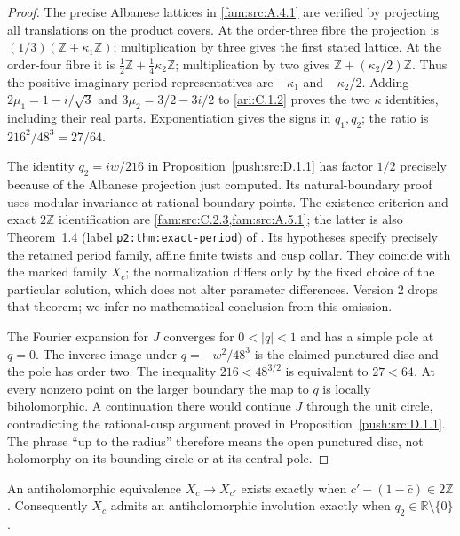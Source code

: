 \begin{proof}
The precise Albanese lattices in \cref{fam:src:A.4.1} are verified by projecting all
translations on the product covers. At the order-three fibre the
projection is $(1/3)(\mathbb Z+\kappa_1\mathbb Z)$; multiplication by
three gives the first stated lattice. At the order-four fibre it is
$\tfrac12\mathbb Z+\tfrac14\kappa_2\mathbb Z$; multiplication by two
gives $\mathbb Z+(\kappa_2/2)\mathbb Z$. Thus the positive-imaginary
period representatives are $-\kappa_1$ and $-\kappa_2/2$.
Adding $2\mu_1=1-i/\sqrt3$ and
$3\mu_2=3/2-3i/2$ to \ref{ari:C.1.2} proves the two $\kappa$ identities,
including their real parts. Exponentiation gives the signs in $q_1,q_2$;
the ratio is $216^2/48^3=27/64$.

The identity $q_2=iw/216$ in Proposition~\ref{push:src:D.1.1} has
factor $1/2$ precisely because of the Albanese projection just computed.
Its natural-boundary proof uses modular invariance at rational boundary
points. The existence criterion and exact $2\mathbb Z$
identification are \cref{fam:src:C.2.3,fam:src:A.5.1}; the latter is also Theorem~1.4
(label \texttt{p2:thm:exact-period}) of
\cite{DuGuoKusakabeXie2026v1}. Its hypotheses specify precisely the
retained period family, affine finite twists and cusp collar. They
coincide with the marked family $X_c$; the normalization differs
only by the fixed choice of the particular solution, which does not
alter parameter differences. Version 2 drops that theorem; we infer
no mathematical conclusion from this omission.

The Fourier expansion for $J$ converges for $0<|q|<1$ and has a simple
pole at $q=0$. The inverse image under $q=-w^2/48^3$ is the claimed
punctured disc and the pole has order two. The inequality
$216<48^{3/2}$ is equivalent to $27<64$. At every nonzero point on the
larger boundary the map to $q$ is locally biholomorphic. A continuation
there would continue $J$ through the unit circle, contradicting the
rational-cusp argument proved in Proposition~\ref{push:src:D.1.1}. The phrase ``up to the
radius'' therefore means the open punctured disc, not holomorphy on
its bounding circle or at its central pole.
\end{proof}

\begin{proposition}\label{ari:C.2.2}
An antiholomorphic equivalence $X_c\to X_{c'}$ exists exactly when
$c'-(1-\bar c)\in2\mathbb Z$. Consequently $X_c$ admits an
antiholomorphic involution exactly when $q_2\in\mathbb R\setminus\{0\}$.
\end{proposition}

